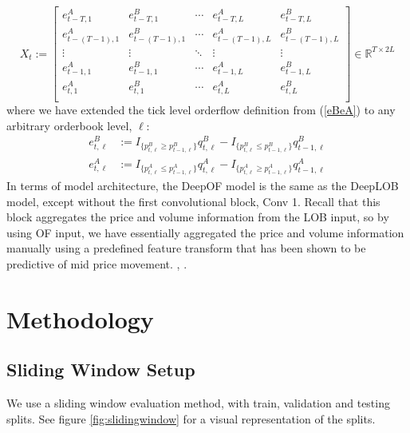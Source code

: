 \documentclass[a4paper, oneside, notitlepage]{book}
\begin{document}
\begin{equation}
X_{t} := \begin{bmatrix}
e_{t-T, 1}^A & e_{t-T, 1}^B &   \cdots & e_{t-T, L}^A & e_{t-T, L}^B \\
e_{t-(T-1), 1}^A & e_{t-(T-1), 1}^B &   \cdots & e_{t-(T-1), L}^A & e_{t-(T-1), L}^B \\
\vdots & \vdots & \ddots & \vdots & \vdots \\
e_{t-1, 1}^A & e_{t-1, 1}^B &  \cdots & e_{t-1, L}^A & e_{t-1, L}^B \\
e_{t, 1}^A & e_{t, 1}^B &  \cdots & e_{t, L}^A & e_{t, L}^B \\
\end{bmatrix} \in \mathbb{R}^{T \times 2L}
\label{DeepLOB_input}
\end{equation}
where we have extended the tick level orderflow definition from (\ref{eBeA}) to any arbitrary orderbook level, $\ell$:
\begin{equation}
    \begin{aligned}
        e_{t, \ell}^B &:= I_{\{p_{t, \ell}^B \ge p_{t-1, \ell}^B\}} q_{t, \ell}^B - I_{\{p_{t, \ell}^B \le p_{t-1, \ell}^B\}} q_{t-1, \ell}^B \\
        e_{t, \ell}^A &:= I_{\{p_{t, \ell}^A \le p_{t-1, \ell}^A\}} q_{t, \ell}^A - I_{\{p_{t, \ell}^A \ge p_{t-1, \ell}^A\}} q_{t-1, \ell}^A
    \end{aligned}
\end{equation}
In terms of model architecture, the DeepOF model is the same as the DeepLOB model, except without
the first convolutional block, Conv 1. Recall that this block aggregates the price and volume information
from the LOB input, so by using OF input, we have essentially aggregated the price and volume information manually
using a predefined feature transform that has been shown to be predictive of mid price movement. \cite{CONT2013}, \cite{KOLM2023}.

\section{Methodology}

\subsection{Sliding Window Setup}
We use a sliding window evaluation method, with train, validation and testing splits.
See figure \ref{fig:slidingwindow} for a visual representation
of the splits.
\end{document}
